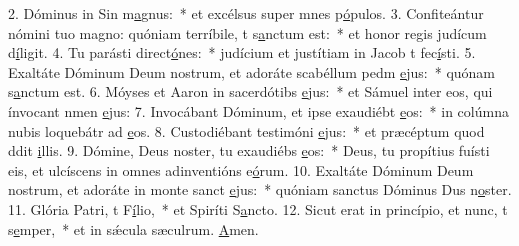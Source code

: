 2. Dóminus in Sin m\uline{a}gnus:~* et excélsus super mnes p\uline{ó}pulos.
3. Confiteántur nómini tuo magno: quóniam terríbile, t s\uline{a}nctum est:~* et honor regis judícum d\uline{í}ligit.
4. Tu parásti direct\uline{ó}nes:~* judícium et justítiam in Jacob t fec\uline{í}sti.
5. Exaltáte Dóminum Deum nostrum, et adoráte scabéllum pedm \uline{e}jus:~* quónam s\uline{a}nctum est.
6. Móyses et Aaron in sacerdótibs \uline{e}jus:~* et Sámuel inter eos, qui ínvocant nmen \uline{e}jus:
7. Invocábant Dóminum, et ipse exaudiébt \uline{e}os:~* in colúmna nubis loquebátr ad \uline{e}os.
8. Custodiébant testimóni \uline{e}jus:~* et præcéptum quod ddit \uline{i}llis.
9. Dómine, Deus noster, tu exaudiébs \uline{e}os:~* Deus, tu propítius fuísti eis, et ulcíscens in omnes adinventións e\uline{ó}rum.
10. Exaltáte Dóminum Deum nostrum, et adoráte in monte sanct \uline{e}jus:~* quóniam sanctus Dóminus Dus n\uline{o}ster.
11. Glória Patri, t F\uline{í}lio,~* et Spiríti S\uline{a}ncto.
12. Sicut erat in princípio, et nunc, t s\uline{e}mper,~* et in sǽcula sæculrum. \uline{A}men.
